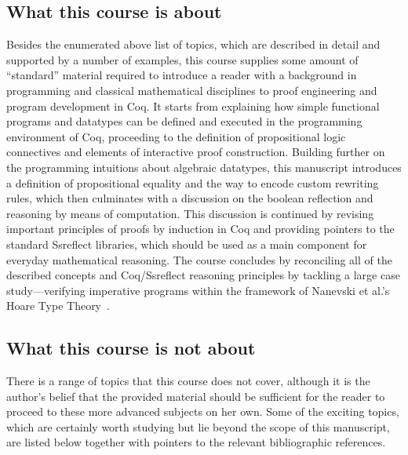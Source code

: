 \subsection{What this course is about}




Besides the enumerated above list of topics, which are described in detail and supported by a number of examples, this course supplies some amount of ``standard'' material required to introduce a reader with a background in programming and classical mathematical disciplines to proof engineering and program development in Coq. It starts from explaining how simple functional programs and datatypes can be defined and executed in the programming environment of Coq, proceeding to the definition of propositional logic connectives and elements of interactive proof construction. Building further on the programming intuitions about algebraic datatypes, this manuscript introduces a definition of propositional equality and the way to encode custom rewriting rules, which then culminates with a discussion on the boolean reflection and reasoning by means of computation. This discussion is continued by revising important principles of proofs by induction in Coq and providing pointers to the standard Ssreflect libraries, which should be used as a main component for everyday mathematical reasoning. The course concludes by reconciling all of the described concepts and Coq/Ssreflect reasoning principles by tackling a large case study---verifying imperative programs within the framework of Nanevski et al.'s Hoare Type Theory~\cite{Nanevski-al:ICFP06,Nanevski-al:JFP08}.


\subsection{What this course is not about}




There is a range of topics that this course does not cover, although it is the author's belief that the provided material should be sufficient for the reader to proceed to these more advanced subjects on her own. Some of the exciting topics, which are certainly worth studying but lie beyond the scope of this manuscript, are listed below together with pointers to the relevant bibliographic references.



